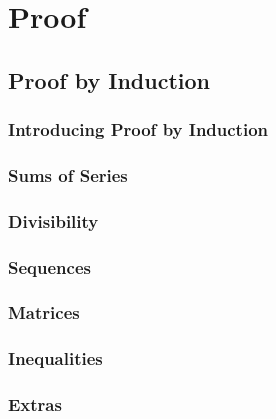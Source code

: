 \documentclass[../maths.tex]{subfiles}
\begin{document}
\chapter{Proof}
\section{Proof by Induction}
\subsection*{Introducing Proof by Induction}
\subsection*{Sums of Series}
\subsection*{Divisibility}
\subsection*{Sequences}
\subsection*{Matrices}
\subsection*{Inequalities}
\subsection*{Extras}
\end{document}
